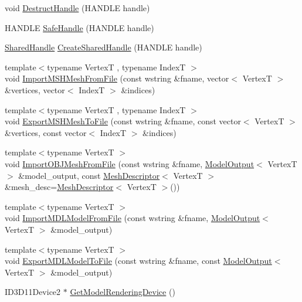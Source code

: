 \begin{DoxyCompactItemize}
\item 
void \hyperlink{namespacemage_a7bf12816896ea8d126d397f0c6d571b1}{Destruct\+Handle} (H\+A\+N\+D\+LE handle)
\item 
H\+A\+N\+D\+LE \hyperlink{namespacemage_a80f95ce7eb0d03d5576351663d626b4d}{Safe\+Handle} (H\+A\+N\+D\+LE handle)
\item 
\hyperlink{namespacemage_ab892828913d6129acf71e0cec60467e5}{Shared\+Handle} \hyperlink{namespacemage_a3119898d7caac71d8ee495c3ae3194b1}{Create\+Shared\+Handle} (H\+A\+N\+D\+LE handle)
\item 
{\footnotesize template$<$typename VertexT , typename IndexT $>$ }\\void \hyperlink{namespacemage_ad98d571312abaaa2b0b7dd13958f5100}{Import\+M\+S\+H\+Mesh\+From\+File} (const wstring \&fname, vector$<$ VertexT $>$ \&vertices, vector$<$ IndexT $>$ \&indices)
\item 
{\footnotesize template$<$typename VertexT , typename IndexT $>$ }\\void \hyperlink{namespacemage_a6558ce42c284f76e6bb08bc0f9cabfc3}{Export\+M\+S\+H\+Mesh\+To\+File} (const wstring \&fname, const vector$<$ VertexT $>$ \&vertices, const vector$<$ IndexT $>$ \&indices)
\item 
{\footnotesize template$<$typename VertexT $>$ }\\void \hyperlink{namespacemage_abeaf36b602f5ed971b1b505e42972e4f}{Import\+O\+B\+J\+Mesh\+From\+File} (const wstring \&fname, \hyperlink{structmage_1_1_model_output}{Model\+Output}$<$ VertexT $>$ \&model\+\_\+output, const \hyperlink{structmage_1_1_mesh_descriptor}{Mesh\+Descriptor}$<$ VertexT $>$ \&mesh\+\_\+desc=\hyperlink{structmage_1_1_mesh_descriptor}{Mesh\+Descriptor}$<$ VertexT $>$())
\item 
{\footnotesize template$<$typename VertexT $>$ }\\void \hyperlink{namespacemage_a8eae2acc25c819aa8973e206a7b84b9f}{Import\+M\+D\+L\+Model\+From\+File} (const wstring \&fname, \hyperlink{structmage_1_1_model_output}{Model\+Output}$<$ VertexT $>$ \&model\+\_\+output)
\item 
{\footnotesize template$<$typename VertexT $>$ }\\void \hyperlink{namespacemage_a1e8cf202593cc54387c6d735220ffc0e}{Export\+M\+D\+L\+Model\+To\+File} (const wstring \&fname, const \hyperlink{structmage_1_1_model_output}{Model\+Output}$<$ VertexT $>$ \&model\+\_\+output)
\item 
I\+D3\+D11\+Device2 $\ast$ \hyperlink{namespacemage_aca16dcb4637f074bb6e33d4ba7929686}{Get\+Model\+Rendering\+Device} ()

\end{DoxyCompactItemize}
